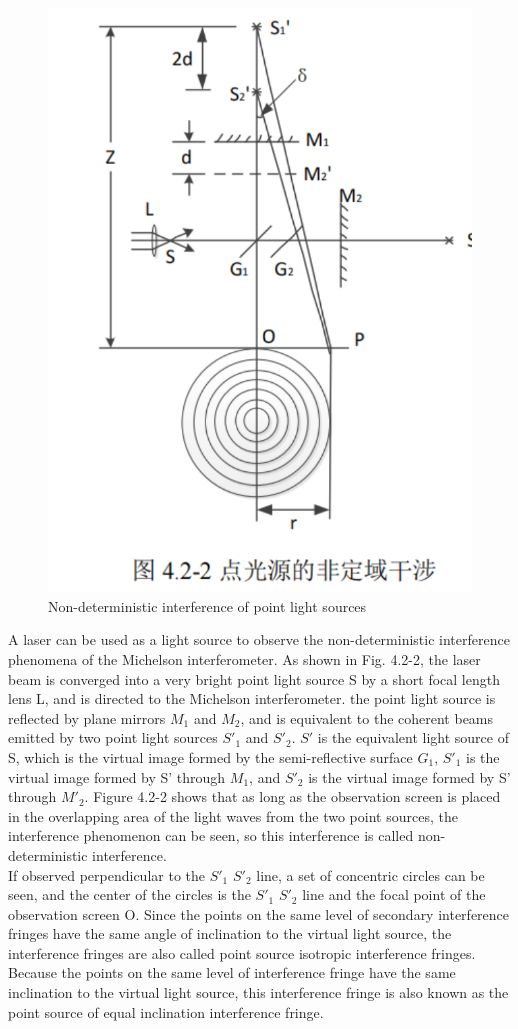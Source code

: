 \documentclass[UTF8]{article}
\begin{document}
\begin{figure}[h]
    \centering
    \includegraphics[width=0.5\linewidth]{FIG4.png}
    \caption{Non-deterministic interference of point light sources}
\end{figure}
A laser can be used as a light source to observe the non-deterministic interference phenomena of the Michelson interferometer. As shown in Fig. 4.2-2, the laser beam is converged into a very bright point light source S by a short focal length lens L, and is directed to the Michelson interferometer. the point light source is reflected by plane mirrors $M_1$ and $M_2$, and is equivalent to the coherent beams emitted by two point light sources $S'_1$ and $S'_2$. $S'$ is the equivalent light source of S, which is the virtual image formed by the semi-reflective surface $G_1$, $S'_1$ is the virtual image formed by S' through $M_1$, and $S'_2$ is the virtual image formed by S' through $M'_2$. Figure 4.2-2 shows that as long as the observation screen is placed in the overlapping area of the light waves from the two point sources, the interference phenomenon can be seen, so this interference is called non-deterministic interference.\\

If observed perpendicular to the $S'_1$ $S'_2$ line, a set of concentric circles can be seen, and the center of the circles is the $S'_1$ $S'_2$ line and the focal point of the observation screen O. Since the points on the same level of secondary interference fringes have the same angle of inclination to the virtual light source, the interference fringes are also called point source isotropic interference fringes. Because the points on the same level of interference fringe have the same inclination to the virtual light source, this interference fringe is also known as the point source of equal inclination interference fringe.\\
\end{document}
